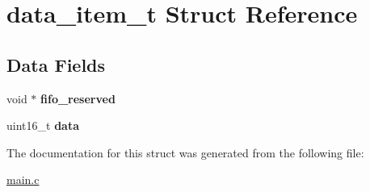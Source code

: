 \hypertarget{structdata__item__t}{}\section{data\+\_\+item\+\_\+t Struct Reference}
\label{structdata__item__t}
\subsection*{Data Fields}
\begin{DoxyCompactItemize}
\item 
\mbox{\label{structdata__item__t_a848b1e8ea5f4c5c51f2f52c8e47f127d}} 
void $\ast$ {\bfseries fifo\+\_\+reserved}
\item 
\mbox{\label{structdata__item__t_aa44c51b27e80e5419c08170ba391f9dd}} 
uint16\+\_\+t {\bfseries data}
\end{DoxyCompactItemize}


The documentation for this struct was generated from the following file\+:\begin{DoxyCompactItemize}
\item 
\hyperlink{main_8c}{main.\+c}\end{DoxyCompactItemize}
